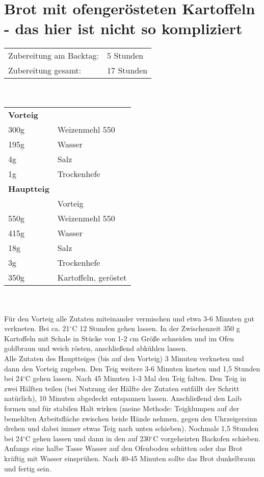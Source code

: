 \section{Brot mit ofengerösteten Kartoffeln - das hier ist nicht so kompliziert}
\begin{tabular}{ll}
    Zubereitung am Backtag: & 5 Stunden  \\
    Zubereitung gesamt:     & 17 Stunden
\end{tabular}\\\paragraph*{}
\begin{tabular}{ll}
    \textbf{Vorteig} \\
    300g & Weizenmehl 550       \\
    195g & Wasser               \\
    4g   & Salz                 \\
    1g   & Trockenhefe          \\
    \textbf{Hauptteig} \\
    & Vorteig              \\
    550g & Weizenmehl 550       \\
    415g & Wasser               \\
    18g  & Salz                 \\
    3g   & Trockenhefe          \\
    350g & Kartoffeln, geröstet
\end{tabular}\\\paragraph*{}
Für den Vorteig alle Zutaten miteinander vermischen und etwa 3-6 Minuten gut verkneten. Bei ca. 21$^\circ$C 12 Stunden gehen lassen. In der Zwischenzeit 350 g Kartoffeln mit Schale in Stücke von 1-2 cm Größe schneiden und im Ofen goldbraun und weich rösten, anschließend abkühlen lassen.\\
Alle Zutaten des Hauptteiges (bis auf den Vorteig) 3 Minuten verkneten und dann den Vorteig zugeben. Den Teig weitere 3-6 Minuten kneten und 1,5 Stunden bei 24$^\circ$C gehen lassen. Nach 45 Minuten 1-3 Mal den Teig falten. Den Teig in zwei Hälften teilen (bei Nutzung der Hälfte der Zutaten entfällt der Schritt natürlich), 10 Minuten abgedeckt entspannen lassen. Anschließend den Laib formen und für stabilen Halt wirken (meine Methode: Teigklumpen auf der bemehlten Arbeitsfläche zwischen beide Hände nehmen, gegen den Uhrzeigersinn drehen und dabei immer etwas Teig nach unten schieben). Nochmals 1,5 Stunden bei 24$^\circ$C gehen lassen und dann in den auf 230$^\circ$C vorgeheizten Backofen schieben. Anfangs eine halbe Tasse Wasser auf den Ofenboden schütten oder das Brot kräftig mit Wasser einsprühen. Nach 40-45 Minuten sollte das Brot dunkelbraun und fertig sein.
\newpage



